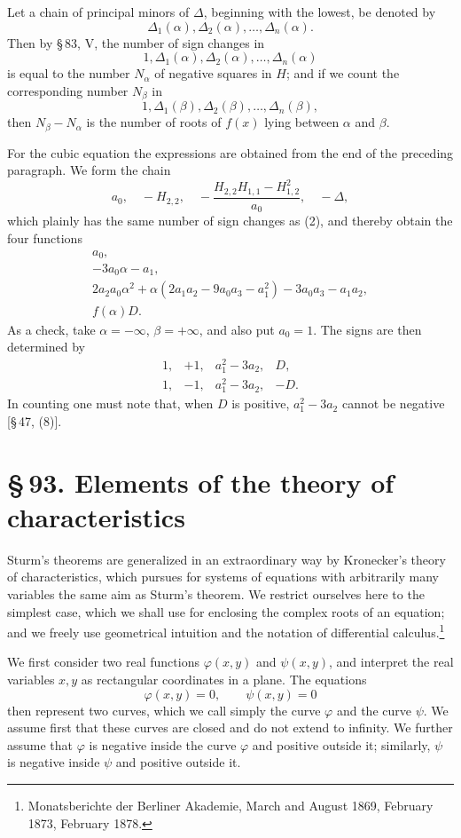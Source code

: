 \documentclass[11pt]{article}
\providecommand{\sect}[2]{\section*{\S\,#1. #2}}
\begin{document}
Let a chain of principal minors of $\Delta$, beginning with the lowest, be denoted by
\[
        \Delta_1(\alpha),\Delta_2(\alpha),\ldots,\Delta_n(\alpha).
\]
Then by \S\,83, V, the number of sign changes in
\begin{equation}
        1,\Delta_1(\alpha),\Delta_2(\alpha),\ldots,\Delta_n(\alpha)
\tag{2}
\end{equation}
is equal to the number $N_\alpha$ of negative squares in $H$; and if we count the corresponding number $N_\beta$ in
\[
        1,\Delta_1(\beta),\Delta_2(\beta),\ldots,\Delta_n(\beta),
\]
then $N_\beta-N_\alpha$ is the number of roots of $f(x)$ lying between $\alpha$ and $\beta$.

For the cubic equation the expressions are obtained from the end of the preceding paragraph. We form the chain
\[
        a_0,
        \quad -H_{2,2},
        \quad -\frac{H_{2,2}H_{1,1}-H_{1,2}^2}{a_0},
        \quad -\Delta,
\]
which plainly has the same number of sign changes as (2), and thereby obtain the four functions
\[
\begin{array}{l}
 a_0,\\[0.2em]
 -3a_0\alpha-a_1,\\[0.2em]
 2a_2a_0\alpha^2+\alpha(2a_1a_2-9a_0a_3-a_1^2)-3a_0a_3-a_1a_2,\\[0.2em]
 f(\alpha)D.
\end{array}
\]
As a check, take $\alpha=-\infty$, $\beta=+\infty$, and also put $a_0=1$. The signs are then determined by
\[
\begin{array}{llll}
1,&+1,&a_1^2-3a_2,&D,\\
1,&-1,&a_1^2-3a_2,&-D.
\end{array}
\]
In counting one must note that, when $D$ is positive, $a_1^2-3a_2$ cannot be negative [\S\,47, (8)].

\sect{93}{Elements of the theory of characteristics}

Sturm's theorems are generalized in an extraordinary way by Kronecker's theory of characteristics, which pursues for systems of equations with arbitrarily many variables the same aim as Sturm's theorem. We restrict ourselves here to the simplest case, which we shall use for enclosing the complex roots of an equation; and we freely use geometrical intuition and the notation of differential calculus.\footnote{Monatsberichte der Berliner Akademie, March and August 1869, February 1873, February 1878.}

We first consider two real functions $\varphi(x,y)$ and $\psi(x,y)$, and interpret the real variables $x,y$ as rectangular coordinates in a plane. The equations
\begin{equation}
        \varphi(x,y)=0,\qquad \psi(x,y)=0
\tag{1}
\end{equation}
then represent two curves, which we call simply the curve $\varphi$ and the curve $\psi$. We assume first that these curves are closed and do not extend to infinity. We further assume that $\varphi$ is negative inside the curve $\varphi$ and positive outside it; similarly, $\psi$ is negative inside $\psi$ and positive outside it.
\end{document}
